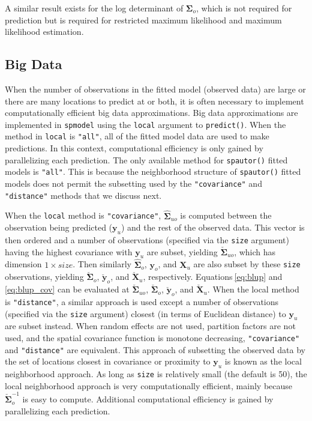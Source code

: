 \documentclass[10pt,letterpaper]{article}
\begin{document}
A similar result exists for the log determinant of
\(\boldsymbol{\Sigma}_o\), which is not required for prediction but is
required for restricted maximum likelihood and maximum likelihood
estimation.

\hypertarget{big-data-1}{%
\subsection{Big Data}\label{big-data-1}}

When the number of observations in the fitted model (observed data) are
large or there are many locations to predict at or both, it is often
necessary to implement computationally efficient big data
approximations. Big data approximations are implemented in
\texttt{spmodel} using the \texttt{local} argument to
\texttt{predict()}. When the method in \texttt{local} is \texttt{"all"},
all of the fitted model data are used to make predictions. In this
context, computational efficiency is only gained by parallelizing each
prediction. The only available method for \texttt{spautor()} fitted
models is \texttt{"all"}. This is because the neighborhood structure of
\texttt{spautor()} fitted models does not permit the subsetting used by
the \texttt{"covariance"} and \texttt{"distance"} methods that we
discuss next.

When the \texttt{local} method is \texttt{"covariance"},
\(\hat{\boldsymbol{\Sigma}}_{uo}\) is computed between the observation
being predicted (\(\mathbf{y}_u\)) and the rest of the observed data.
This vector is then ordered and a number of observations (specified via
the \texttt{size} argument) having the highest covariance with
\(\mathbf{y}_u\) are subset, yielding
\(\check{\boldsymbol{\Sigma}}_{uo}\), which has dimension
\(1 \times size\). Then similarly \(\hat{\boldsymbol{\Sigma}}_o\),
\(\mathbf{y}_o\), and \(\mathbf{X}_u\) are also subset by these
\texttt{size} observations, yielding
\(\check{\boldsymbol{\Sigma}}_{o}\), \(\check{\mathbf{y}}_o\), and
\(\check{\mathbf{X}}_u\), respectively. Equations\(~\)\ref{eq:blup} and
\ref{eq:blup_cov} can be evaluated at
\(\check{\boldsymbol{\Sigma}}_{uo}\),
\(\check{\boldsymbol{\Sigma}}_{o}\), \(\check{\mathbf{y}}_o\), and
\(\check{\mathbf{X}}_u\). When the local method is \texttt{"distance"},
a similar approach is used except a number of observations (specified
via the \texttt{size} argument) closest (in terms of Euclidean distance)
to \(\mathbf{y}_u\) are subset instead. When random effects are not
used, partition factors are not used, and the spatial covariance
function is monotone decreasing, \texttt{"covariance"} and
\texttt{"distance"} are equivalent. This approach of subsetting the
observed data by the set of locations closest in covariance or proximity
to \(\mathbf{y}_u\) is known as the local neighborhood approach. As long
as \texttt{size} is relatively small (the default is 50), the local
neighborhood approach is very computationally efficient, mainly because
\(\check{\boldsymbol{\Sigma}}_{o}^{-1}\) is easy to compute. Additional
computational efficiency is gained by parallelizing each prediction.
\end{document}
